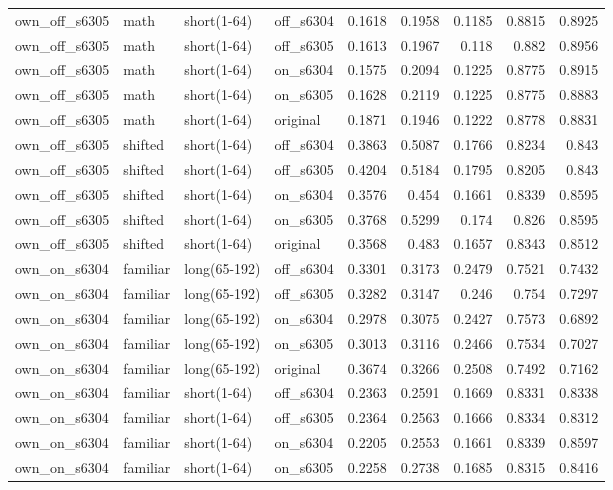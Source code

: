 \begin{table}
\begin{tabular}{llllrrrrr}
own\_off\_s6305 & math & short(1-64) & off\_s6304 & 0.1618 & 0.1958 & 0.1185 & 0.8815 & 0.8925 \\
own\_off\_s6305 & math & short(1-64) & off\_s6305 & 0.1613 & 0.1967 & 0.118 & 0.882 & 0.8956 \\
own\_off\_s6305 & math & short(1-64) & on\_s6304 & 0.1575 & 0.2094 & 0.1225 & 0.8775 & 0.8915 \\
own\_off\_s6305 & math & short(1-64) & on\_s6305 & 0.1628 & 0.2119 & 0.1225 & 0.8775 & 0.8883 \\
own\_off\_s6305 & math & short(1-64) & original & 0.1871 & 0.1946 & 0.1222 & 0.8778 & 0.8831 \\
own\_off\_s6305 & shifted & short(1-64) & off\_s6304 & 0.3863 & 0.5087 & 0.1766 & 0.8234 & 0.843 \\
own\_off\_s6305 & shifted & short(1-64) & off\_s6305 & 0.4204 & 0.5184 & 0.1795 & 0.8205 & 0.843 \\
own\_off\_s6305 & shifted & short(1-64) & on\_s6304 & 0.3576 & 0.454 & 0.1661 & 0.8339 & 0.8595 \\
own\_off\_s6305 & shifted & short(1-64) & on\_s6305 & 0.3768 & 0.5299 & 0.174 & 0.826 & 0.8595 \\
own\_off\_s6305 & shifted & short(1-64) & original & 0.3568 & 0.483 & 0.1657 & 0.8343 & 0.8512 \\
own\_on\_s6304 & familiar & long(65-192) & off\_s6304 & 0.3301 & 0.3173 & 0.2479 & 0.7521 & 0.7432 \\
own\_on\_s6304 & familiar & long(65-192) & off\_s6305 & 0.3282 & 0.3147 & 0.246 & 0.754 & 0.7297 \\
own\_on\_s6304 & familiar & long(65-192) & on\_s6304 & 0.2978 & 0.3075 & 0.2427 & 0.7573 & 0.6892 \\
own\_on\_s6304 & familiar & long(65-192) & on\_s6305 & 0.3013 & 0.3116 & 0.2466 & 0.7534 & 0.7027 \\
own\_on\_s6304 & familiar & long(65-192) & original & 0.3674 & 0.3266 & 0.2508 & 0.7492 & 0.7162 \\
own\_on\_s6304 & familiar & short(1-64) & off\_s6304 & 0.2363 & 0.2591 & 0.1669 & 0.8331 & 0.8338 \\
own\_on\_s6304 & familiar & short(1-64) & off\_s6305 & 0.2364 & 0.2563 & 0.1666 & 0.8334 & 0.8312 \\
own\_on\_s6304 & familiar & short(1-64) & on\_s6304 & 0.2205 & 0.2553 & 0.1661 & 0.8339 & 0.8597 \\
own\_on\_s6304 & familiar & short(1-64) & on\_s6305 & 0.2258 & 0.2738 & 0.1685 & 0.8315 & 0.8416 \\

\end{tabular}
\end{table}
